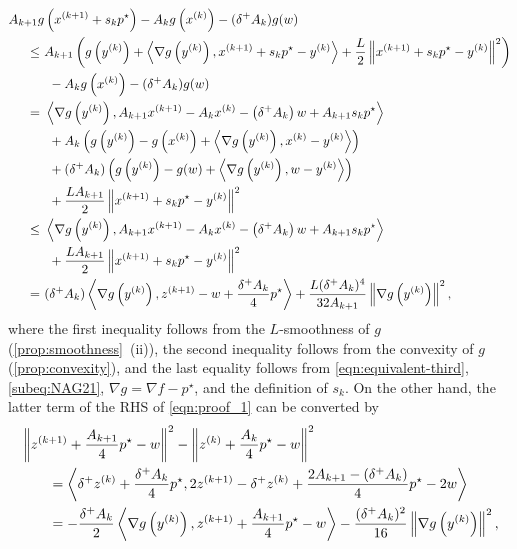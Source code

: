 \documentclass[11pt,a4paper]{article}
\theoremstyle{definition}
\theoremstyle{plain}
\begin{document}
\begin{align}
    A_{k + 1}g&\left(x^{(k + 1)} + s_kp^\star\right) - A_kg\left(x^{(k)}\right) - (\delta^+A_k)g(w)\notag\\
    \le\ & A_{k + 1}\left(g\left(y^{(k)}\right) + \left\langle\nabla g\left(y^{(k)}\right), x^{(k + 1)} + s_kp^\star - y^{(k)}\right\rangle + \frac{L}2\left\|x^{(k + 1)} + s_kp^\star - y^{(k)}\right\|^2\right)\notag\\
    &\ - A_kg\left(x^{(k)}\right) - (\delta^+A_k)g(w)\notag\\
    =\ & \left\langle\nabla g\left(y^{(k)}\right), A_{k + 1}x^{(k + 1)} - A_kx^{(k)} - \left(\delta^+A_k\right)w + A_{k + 1}s_kp^\star\right\rangle\notag\\
    &\ + A_k\left(g\left(y^{(k)}\right) - g\left(x^{(k)}\right) + \left\langle\nabla g\left(y^{(k)}\right), x^{(k)} - y^{(k)}\right\rangle\right)\notag\\
    &\ + (\delta^+A_k)\left(g\left(y^{(k)}\right) - g(w) + \left\langle\nabla g\left(y^{(k)}\right), w - y^{(k)}\right\rangle\right)\notag\\
    &\ + \frac{LA_{k + 1}}2\left\|x^{(k + 1)} + s_kp^\star - y^{(k)}\right\|^2\notag\\
    \le\ & \left\langle\nabla g\left(y^{(k)}\right), A_{k + 1}x^{(k + 1)} - A_kx^{(k)} - \left(\delta^+A_k\right)w + A_{k + 1}s_kp^\star\right\rangle\notag\\
    &\ + \frac{LA_{k + 1}}2\left\|x^{(k + 1)} + s_kp^\star - y^{(k)}\right\|^2\notag\\
    =\ & (\delta^+A_k)\left\langle\nabla g\left(y^{(k)}\right), z^{(k + 1)} - w + \frac{\delta^+A_k}4p^\star\right\rangle + \frac{L(\delta^+A_k)^4}{32A_{k + 1}}\left\|\nabla g\left(y^{(k)}\right)\right\|^2,\label{eqn:proof_2}
\end{align}
where the first inequality follows from the $L$-smoothness of $g$ (\cref{prop:smoothness}~(ii)), the second inequality follows from the convexity of $g$ (\cref{prop:convexity}), and the last equality follows from \eqref{eqn:equivalent-third}, \eqref{subeq:NAG21}, $\nabla g = \nabla f - p^\star$, and the definition of $s_k$.
On the other hand, the latter term of the RHS of \eqref{eqn:proof_1} can be converted by
\begin{align}
    &\left\|z^{(k + 1)} + \frac{A_{k + 1}}4p^\star - w\right\|^2 - \left\|z^{(k)} + \frac{A_k}4p^\star - w\right\|^2\notag\\
    &\qquad= \left\langle\delta^+z^{(k)} + \frac{\delta^+A_k}4p^\star, 2z^{(k + 1)} - \delta^+z^{(k)} + \frac{2A_{k + 1} - (\delta^+A_k)}4p^\star - 2w\right\rangle\notag\\
    &\qquad= -\frac{\delta^+A_k}2\left\langle\nabla g\left(y^{(k)}\right), z^{(k + 1)} + \frac{A_{k + 1}}4p^\star - w\right\rangle - \frac{(\delta^+A_k)^2}{16}\left\|\nabla g\left(y^{(k)}\right)\right\|^2,\label{eqn:proof_4}
\end{align}
\end{document}
